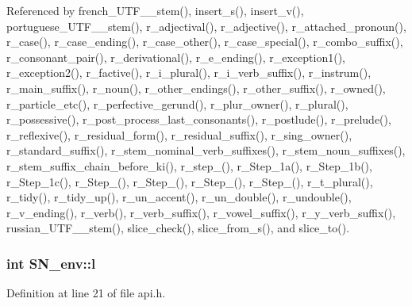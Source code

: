 Referenced by french\_\-UTF\_\_\-stem(), insert\_\-s(), insert\_\-v(), portuguese\_\-UTF\_\_\-stem(), r\_\-adjectival(), r\_\-adjective(), r\_\-attached\_\-pronoun(), r\_\-case(), r\_\-case\_\-ending(), r\_\-case\_\-other(), r\_\-case\_\-special(), r\_\-combo\_\-suffix(), r\_\-consonant\_\-pair(), r\_\-derivational(), r\_\-e\_\-ending(), r\_\-exception1(), r\_\-exception2(), r\_\-factive(), r\_\-i\_\-plural(), r\_\-i\_\-verb\_\-suffix(), r\_\-instrum(), r\_\-main\_\-suffix(), r\_\-noun(), r\_\-other\_\-endings(), r\_\-other\_\-suffix(), r\_\-owned(), r\_\-particle\_\-etc(), r\_\-perfective\_\-gerund(), r\_\-plur\_\-owner(), r\_\-plural(), r\_\-possessive(), r\_\-post\_\-process\_\-last\_\-consonants(), r\_\-postlude(), r\_\-prelude(), r\_\-reflexive(), r\_\-residual\_\-form(), r\_\-residual\_\-suffix(), r\_\-sing\_\-owner(), r\_\-standard\_\-suffix(), r\_\-stem\_\-nominal\_\-verb\_\-suffixes(), r\_\-stem\_\-noun\_\-suffixes(), r\_\-stem\_\-suffix\_\-chain\_\-before\_\-ki(), r\_\-step\_(), r\_\-Step\_\-1a(), r\_\-Step\_\-1b(), r\_\-Step\_\-1c(), r\_\-Step\_(), r\_\-Step\_(), r\_\-Step\_(), r\_\-Step\_(), r\_\-t\_\-plural(), r\_\-tidy(), r\_\-tidy\_\-up(), r\_\-un\_\-accent(), r\_\-un\_\-double(), r\_\-undouble(), r\_\-v\_\-ending(), r\_\-verb(), r\_\-verb\_\-suffix(), r\_\-vowel\_\-suffix(), r\_\-y\_\-verb\_\-suffix(), russian\_\-UTF\_\_\-stem(), slice\_\-check(), slice\_\-from\_\-s(), and slice\_\-to().\hypertarget{structSN__env_ebb292b34aa233b42d32074e254dc754}{
\subsubsection[{l}]{\setlength{\rightskip}{0pt plus 5cm}int {\bf SN\_\-env::l}}}
\label{structSN__env_ebb292b34aa233b42d32074e254dc754}




Definition at line 21 of file api.h.

